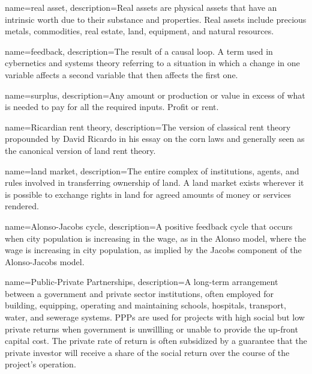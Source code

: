 {
name=real asset,
description={Real assets are physical assets that have an intrinsic worth due to their substance and properties. Real assets include precious metals, commodities, real estate, land, equipment, and natural resources. }
}


{
name=feedback,
description={The result of a causal loop. A term used in cybernetics and systems theory referring to a situation in which a change in one variable affects a second variable that then affects the first one.}
}

{
name=surplus,
description={Any amount or production or value in excess of what  is needed to pay for all the required inputs. Profit or rent. }
}

{
name=Ricardian rent theory,
description={The version of classical rent theory propounded by David Ricardo in his essay on the corn laws and generally seen as the  canonical version of land rent theory.}
}

{
name=land market,
description={The entire complex of institutions, agents, and rules involved in transferring ownership of land. A land market exists wherever it is possible to exchange rights in land for agreed amounts of money or services rendered.}
}

{
name=Alonso-Jacobs cycle,
description={A positive \gls{feedback} cycle that occurs when city population is increasing in the wage, as in the Alonso model, where the wage is increasing in city population, as implied by the Jacobs component of the \gls{Alonso-Jacobs model}.}
}

{
name=Public-Private Partnerships,
description={A long-term arrangement between a government and private sector institutions, often  employed for building, equipping, operating and maintaining schools, hospitals, transport, water, and sewerage systems. PPPs are used for projects with high social but low private returns when government is unwillling or unable to provide the up-front capital cost. The private rate of return is often subsidized by a guarantee that the private investor will receive a share of the social return over the course of the project's operation.}
}

